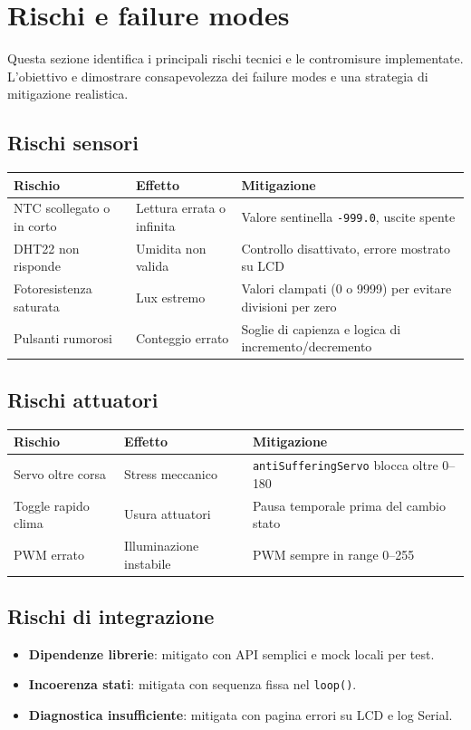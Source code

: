 \chapter{Rischi e failure modes}

Questa sezione identifica i principali rischi tecnici e le contromisure implementate. L'obiettivo e dimostrare consapevolezza dei failure modes e una strategia di mitigazione realistica.

\section{Rischi sensori}
\small
\begin{longtable}{@{}>{\raggedright\arraybackslash}p{3.6cm}>{\raggedright\arraybackslash}p{6.2cm}>{\raggedright\arraybackslash}p{5.2cm}@{}}
\toprule
Rischio & Effetto & Mitigazione \\
\midrule
NTC scollegato o in corto & Lettura errata o infinita & Valore sentinella \texttt{-999.0}, uscite spente \\
DHT22 non risponde & Umidita non valida & Controllo disattivato, errore mostrato su LCD \\
Fotoresistenza saturata & Lux estremo & Valori clampati (0 o 9999) per evitare divisioni per zero \\
Pulsanti rumorosi & Conteggio errato & Soglie di capienza e logica di incremento/decremento \\
\bottomrule
\end{longtable}
\normalsize

\section{Rischi attuatori}
\small
\begin{longtable}{@{}>{\raggedright\arraybackslash}p{3.6cm}>{\raggedright\arraybackslash}p{6.2cm}>{\raggedright\arraybackslash}p{5.2cm}@{}}
\toprule
Rischio & Effetto & Mitigazione \\
\midrule
Servo oltre corsa & Stress meccanico & \texttt{antiSufferingServo} blocca oltre 0--180 \\
Toggle rapido clima & Usura attuatori & Pausa temporale prima del cambio stato \\
PWM errato & Illuminazione instabile & PWM sempre in range 0--255 \\
\bottomrule
\end{longtable}
\normalsize

\section{Rischi di integrazione}
\begin{itemize}
  \item \textbf{Dipendenze librerie}: mitigato con API semplici e mock locali per test.
  \item \textbf{Incoerenza stati}: mitigata con sequenza fissa nel \texttt{loop()}.
  \item \textbf{Diagnostica insufficiente}: mitigata con pagina errori su LCD e log Serial.
\end{itemize}
